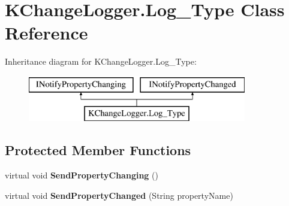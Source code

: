 \hypertarget{class_k_change_logger_1_1_log___type}{\section{K\-Change\-Logger.\-Log\-\_\-\-Type Class Reference}
\label{class_k_change_logger_1_1_log___type}
}
Inheritance diagram for K\-Change\-Logger.\-Log\-\_\-\-Type\-:\begin{figure}[H]
\begin{center}
\leavevmode
\includegraphics[height=2.000000cm]{class_k_change_logger_1_1_log___type}
\end{center}
\end{figure}
\subsection*{Protected Member Functions}
\begin{DoxyCompactItemize}
\item 
\hypertarget{class_k_change_logger_1_1_log___type_a4663e4a5b118e14f04f4885bfb03aed7}{virtual void {\bfseries Send\-Property\-Changing} ()}\label{class_k_change_logger_1_1_log___type_a4663e4a5b118e14f04f4885bfb03aed7}

\item 
\hypertarget{class_k_change_logger_1_1_log___type_a8d74fd269b4f619455f65a3f4d461993}{virtual void {\bfseries Send\-Property\-Changed} (String property\-Name)}\label{class_k_change_logger_1_1_log___type_a8d74fd269b4f619455f65a3f4d461993}

\end{DoxyCompactItemize}
